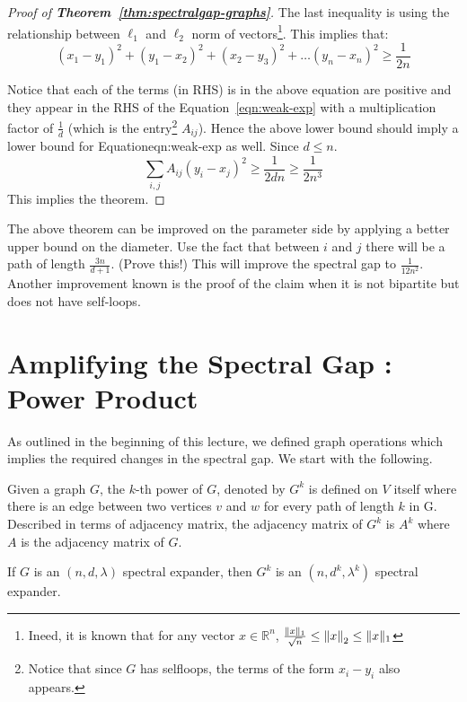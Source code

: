 \begin{proof}[{Proof of \bf Theorem~\ref{thm:spectralgap-graphs}}]
\noindent The last inequality is using the relationship between $\ell_1$ and $\ell_2$ norm of vectors\footnote{Ineed, it is known that for any vector $x \in \mathbb{R}^n$, $\frac{\Vert x \Vert_1}{\sqrt{n}} \le {\left\lVert x\right\rVert}_2 \le \Vert x \Vert_1$}.
This implies that:
$$(x_1 - y_1)^2 + (y_1 - x_2)^2 + (x_2 - y_3)^2 + \ldots (y_n -  x_n)^2 \ge \frac{1}{2n}$$

Notice that each of the terms (in RHS) is  in the above equation are positive and they appear in the RHS of the Equation~\ref{eqn:weak-exp} with a multiplication factor of $\frac{1}{d}$ (which is the entry\footnote{Notice that since $G$ has selfloops, the terms of the form $x_i-y_i$ also appears.} $A_{ij}$). Hence the above lower bound should imply a lower bound for Equation{eqn:weak-exp} as well. Since $d \le n$.
$$\sum_{i,j} A_{ij}(y_i-x_j)^2 \ge \frac{1}{2dn} \ge \frac{1}{2n^3}$$
This implies the theorem.
\end{proof}
\begin{remark}
The above theorem can be improved on the parameter side by applying a better upper bound on the diameter. Use the fact that between $i$ and $j$ there will be a path of length $\frac{3n}{d+1}$. (Prove this!) This will improve the spectral gap to $\frac{1}{12n^2}$. Another improvement known is the proof of the claim when it is not bipartite but does not have self-loops.
\end{remark}

\section{Amplifying the Spectral Gap : Power Product}

As outlined in the beginning of this lecture, we defined graph operations which implies the required changes in the spectral gap. We start with the following.

\begin{definition}
Given a graph $G$, the $k$-th power of $G$, denoted by $G^k$ is defined on $V$ itself where there is an edge between two vertices $v$ and $w$ for every path of length $k$ in G. Described in terms of adjacency matrix, the adjacency matrix of $G^k$ is $A^k$ where $A$ is the adjacency matrix of $G$.
\end{definition}

\begin{theorem}
If $G$ is an $(n,d,\lambda)$ spectral expander, then $G^k$ is an $(n,d^k,\lambda^k)$ spectral expander.
\end{theorem}

